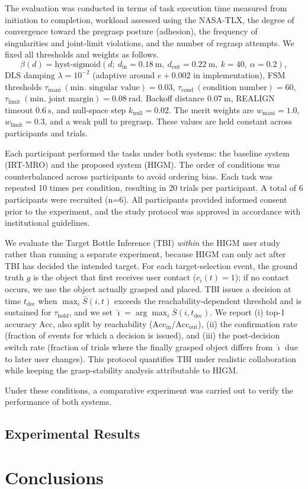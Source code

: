 \documentclass[../../main.tex]{subfiles} %
\begin{document}
The evaluation was conducted in terms of task execution time measured 
from initiation to completion, workload assessed using the NASA-TLX\cite{Nasa}, 
the degree of convergence toward the pregrasp posture (adhesion), 
the frequency of singularities and joint-limit violations, and the 
number of regrasp attempts. 
We fixed all thresholds and weights as follows.
\[
\beta(d)=\mathrm{hyst\text{-}sigmoid}(d;\ d_{\mathrm{in}}{=}0.18\ \mathrm{m},\ d_{\mathrm{out}}{=}0.22\ \mathrm{m},\ k{=}40,\ \alpha{=}0.2),
\]
DLS damping $\lambda=10^{-2}$ (adaptive around $e+0.002$ in implementation),
FSM thresholds $\tau_{\text{mani}}\ (\text{min.\ singular value})=0.03$,
$\tau_{\text{cond}}\ (\text{condition number})=60$,
$\tau_{\text{limit}}\ (\text{min.\ joint margin})=0.08\ \mathrm{rad}$.
Backoff distance $0.07\ \mathrm{m}$, REALIGN timeout $0.6\ \mathrm{s}$,
and null-space step $k_{\text{null}}=0.02$.
The merit weights are $w_{\text{mani}}=1.0$, $w_{\text{limit}}=0.3$, and a weak pull to pregrasp.
These values are held constant across participants and trials.

Each participant performed the tasks under both systems:
the baseline system (IRT-MRO) and the proposed system (HIGM).
The order of conditions was counterbalanced across participants to avoid ordering bias.
Each task was repeated 10 times per condition, resulting in 20 trials per participant.
A total of 6 participants were recruited (n=6).
All participants provided informed consent prior to the experiment, 
and the study protocol was approved in accordance with institutional guidelines.


We evaluate the Target Bottle Inference (TBI) \textit{within} the HIGM user study rather than running 
a separate experiment, because HIGM can only act after TBI has decided the intended target. 
For each target-selection event, the ground truth $g$ is the object that first receives user contact ($c_i(t)=1$); 
if no contact occurs, we use the object actually grasped and placed. 
TBI issues a decision at time $t_{\mathrm{dec}}$ when $\max_i \bar S(i,t)$ exceeds the reachability-dependent 
threshold and is sustained for $\tau_{\mathrm{hold}}$, and we set $\hat\imath=\arg\max_i \bar S(i,t_{\mathrm{dec}})$. 
We report (i) top-1 accuracy $\mathrm{Acc}$, 
also split by reachability ($\mathrm{Acc}_{\mathrm{in}}/\mathrm{Acc}_{\mathrm{out}}$), (ii) the 
confirmation rate (fraction of events for which a decision is issued), 
and (iii) the post-decision switch rate (fraction of trials where the finally grasped object 
differs from $\hat\imath$ due to later user changes). This protocol quantifies 
TBI under realistic collaboration while keeping the grasp-stability analysis attributable to HIGM.



Under these conditions, a comparative 
experiment was carried out to verify the performance of both systems.



\subsection{Experimental Results}

\section{Conclusions}
\end{document}
